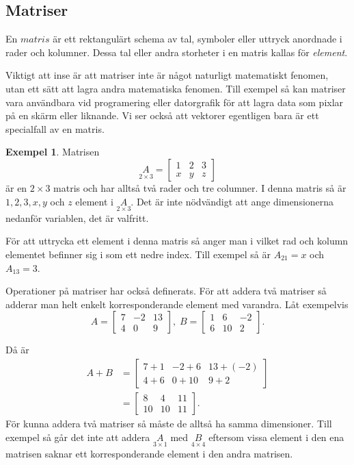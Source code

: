 \documentclass{article}
\theoremstyle{definition}
\newtheorem{exmp}[thm]{Exempel}
\begin{document}
\subsection{Matriser}
\begin{mydef}{}{}
  En $matris$ är ett rektangulärt schema av tal, symboler eller uttryck anordnade i rader och kolumner. 
  Dessa tal eller andra storheter i en matris kallas för \textit{element}.  
\end{mydef}
Viktigt att inse är att 
matriser inte är något naturligt matematiskt fenomen, 
utan ett sätt att lagra andra matematiska fenomen.
Till exempel så kan matriser vara användbara vid programering eller datorgrafik för att lagra data som 
pixlar på en skärm eller liknande. Vi ser också att vektorer egentligen bara är ett specialfall av en 
matris.
\begin{exmp}
Matrisen
\[ \underset{2 \times 3}{A} = 
  \begin{bmatrix}
    1 & 2 & 3 \\
    x & y & z
  \end{bmatrix}
\]
är en $2 \times 3$ matris och har alltså två rader och tre columner.
I denna matris så är $1, 2, 3, x, y$ och $z$ element i $\underset{2 \times 3}{A}.$
Det är inte nödvändigt att ange dimensionerna nedanför variablen, det är valfritt. 

För att uttrycka ett element i denna matris så anger man i vilket rad och kolumn 
elementet befinner sig i som ett nedre index. Till exempel så är 
$A_{21} = x$ och $A_{13} = 3$.
\end{exmp}

Operationer på matriser har också definerats. För att addera två matriser så adderar man helt enkelt korresponderande element med varandra. 
Låt exempelvis 
\[ A = 
  \begin{bmatrix}
    7 & -2 & 13 \\
    4 & 0 & 9
  \end{bmatrix}, \;
  B = 
  \begin{bmatrix}
    1 & 6 & -2 \\
    6 & 10 & 2
  \end{bmatrix}.
\]

Då är 
\begin{align*}
  A + B & =
  \begin{bmatrix}
    7 + 1 & -2 + 6 & 13 + (-2) \\
    4 + 6 & 0 + 10 & 9 + 2
  \end{bmatrix} \\
  & = 
  \begin{bmatrix}
    8 & 4 & 11 \\
    10 & 10 & 11
  \end{bmatrix}.
\end{align*}
För kunna addera två matriser så måste de alltså ha samma 
dimensioner. Till exempel så går det inte att 
addera $\underset{3 \times 1}{A}$ med $\underset{4 \times 4}{B}$ eftersom vissa element i den ena matrisen saknar ett korresponderande element i den andra matrisen.
\end{document}
